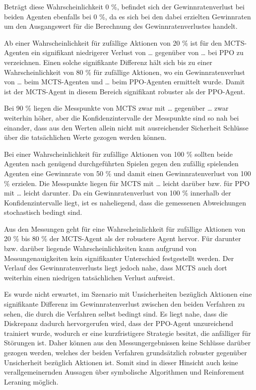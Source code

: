 Beträgt diese Wahrscheinlichkeit 0 \%, befindet sich der Gewinnratenverlust bei beiden Agenten ebenfalls bei 0 \%, da es sich bei den dabei erzielten Gewinnraten um den Ausgangswert für die Berechnung des Gewinnratenverlustes handelt.

Ab einer Wahrscheinlichkeit für zufällige Aktionen von 20 \% ist für den MCTS-Agenten ein signifikant niedrigerer Verlust von … gegenüber von … bei PPO zu verzeichnen. Einen solche signifikante Differenz hält sich bis zu einer Wahrscheinlichkeit von 80 \% für zufällige Aktionen, wo ein Gewinnratenverlust von … beim MCTS-Agenten und … beim PPO-Agenten ermittelt wurde. Damit ist der MCTS-Agent in diesem Bereich signifikant robuster als der PPO-Agent.

Bei 90 \% liegen die Messpunkte von MCTS zwar mit … gegenüber … zwar weiterhin höher, aber die Konfidenzintervalle der Messpunkte sind so nah bei einander, dass aus den Werten allein nicht mit ausreichender Sicherheit Schlüsse über die tatsächlichen Werte gezogen werden können.

Bei einer Wahrscheinlichkeit für zufällige Aktionen von 100 \% sollten beide Agenten nach genügend durchgeführten Spielen gegen den zufällig spielenden Agenten eine Gewinnrate von 50 \% und damit einen Gewinnratenverlust von 100 \% erzielen. Die Messpunkte liegen für MCTS mit … leicht darüber bzw. für PPO mit … leicht darunter. Da ein Gewinnratenverlust von 100 \% innerhalb der Konfidenzintervalle liegt, ist es naheliegend, dass die gemessenen Abweichungen stochastisch bedingt sind.

Aus den Messungen geht für eine Wahrscheinlichkeit für zufällige Aktionen von 20 \% bis 80 \% der MCTS-Agent als der robustere Agent hervor. Für darunter bzw. darüber liegende Wahrscheinlichkeiten kann aufgrund von Messungenauigkeiten kein signifikanter Unterschied festgestellt werden. Der Verlauf des Gewinnratenverlusts liegt jedoch nahe, dass MCTS auch dort weiterhin einen niedrigen tatsächlichen Verlust aufweist.

Es wurde nicht erwartet, im Szenario mit Unsicherheiten bezüglich Aktionen eine signifikante Differenz im Gewinnratenverlust zwischen den beiden Verfahren zu sehen, die durch die Verfahren selbst bedingt sind. Es liegt nahe, dass die Diskrepanz dadurch hervorgerufen wird, dass der PPO-Agent unzureichend trainiert wurde, wodurch er eine kurzfristigere Strategie besitzt, die anfälliger für Störungen ist. Daher können aus den Messungergebnissen keine Schlüsse darüber gezogen werden, welches der beiden Verfahren grundsätzlich robuster gegenüber Unsicherheit bezüglich Aktionen ist. Somit sind in dieser Hinsicht auch keine verallgemeinernden Aussagen über symbolische Algorithmen und Reinforement Leraning möglich.

